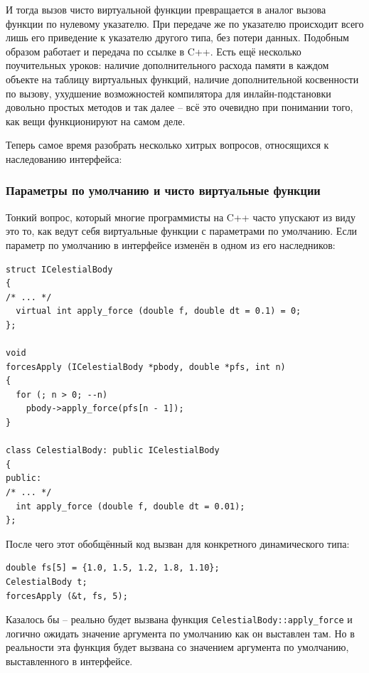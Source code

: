 \documentclass[a4paper,12pt,oneside]{article}
\begin{document}
И тогда вызов чисто виртуальной функции превращается в аналог вызова функции по нулевому указателю. При передаче же по указателю происходит всего лишь его приведение к указателю другого типа, без потери данных. Подобным образом работает и передача по ссылке в C++. Есть ещё несколько поучительных уроков: наличие дополнительного расхода памяти в каждом объекте на таблицу виртуальных функций, наличие дополнительной косвенности по вызову, ухудшение возможностей компилятора для инлайн-подстановки довольно простых методов и так далее -- всё это очевидно при понимании того, как вещи функционируют на самом деле.

Теперь самое время разобрать несколько хитрых вопросов, относящихся к наследованию интерфейса:

\subsubsection{Параметры по умолчанию и чисто виртуальные функции}\label{DefArguments}

Тонкий вопрос, который многие программисты на C++ часто упускают из виду это то, как ведут себя виртуальные функции с параметрами по умолчанию. Если параметр по умолчанию в интерфейсе изменён в одном из его наследников:

\begin{lstlisting}
struct ICelestialBody
{
/* ... */
  virtual int apply_force (double f, double dt = 0.1) = 0;
};

void 
forcesApply (ICelestialBody *pbody, double *pfs, int n)
{
  for (; n > 0; --n)
    pbody->apply_force(pfs[n - 1]);
}

class CelestialBody: public ICelestialBody
{
public:
/* ... */
  int apply_force (double f, double dt = 0.01);
};
\end{lstlisting}

После чего этот обобщённый код вызван для конкретного динамического типа:

\begin{lstlisting}
double fs[5] = {1.0, 1.5, 1.2, 1.8, 1.10};
CelestialBody t;
forcesApply (&t, fs, 5);
\end{lstlisting}

Казалось бы -- реально будет вызвана функция \lstinline!CelestialBody::apply_force! и логично ожидать значение аргумента по умолчанию как он выставлен там. Но в реальности эта функция будет вызвана со значением аргумента по умолчанию, выставленного в интерфейсе.
\end{document}
